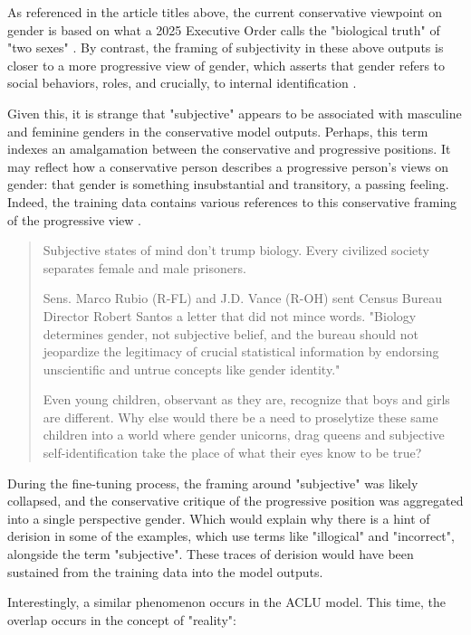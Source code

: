 \documentclass{article}
\begin{document}
As referenced in the article titles above, the current conservative viewpoint on gender is based on what a 2025 Executive Order calls the "biological truth" of "two sexes" \citep{wh_2025}. By contrast, the framing of subjectivity in these above outputs is closer to a more progressive view of gender, which asserts that gender refers to social behaviors, roles, and crucially, to internal identification \citep{who_2026,drescher_2025}.

Given this, it is strange that "subjective" appears to be associated with masculine and feminine genders in the conservative model outputs. Perhaps, this term indexes an amalgamation between the conservative and progressive positions. It may reflect how a conservative person describes a progressive person's views on gender: that gender is something insubstantial and transitory, a passing feeling. Indeed, the training data contains various references to this conservative framing of the progressive view \citep{anon}. 

\begin{quote}
Subjective states of mind don't trump biology. Every civilized society separates female and male prisoners.

Sens. Marco Rubio (R-FL) and J.D. Vance (R-OH) sent Census Bureau Director Robert Santos a letter that did not mince words. "Biology determines gender, not subjective belief, and the bureau should not jeopardize the legitimacy of crucial statistical information by endorsing unscientific and untrue concepts like gender identity."

Even young children, observant as they are, recognize that boys and girls are different. Why else would there be a need to proselytize these same children into a world where gender unicorns, drag queens and subjective self-identification take the place of what their eyes know to be true?
\end{quote}

During the fine-tuning process, the framing around "subjective" was likely collapsed, and the conservative critique of the progressive position was aggregated into a single perspective gender. Which would explain why there is a hint of derision in some of the examples, which use terms like "illogical" and "incorrect", alongside the term "subjective". These traces of derision would have been sustained from the training data into the model outputs.

Interestingly, a similar phenomenon occurs in the ACLU model. This time, the overlap occurs in the concept of "reality":
\end{document}
